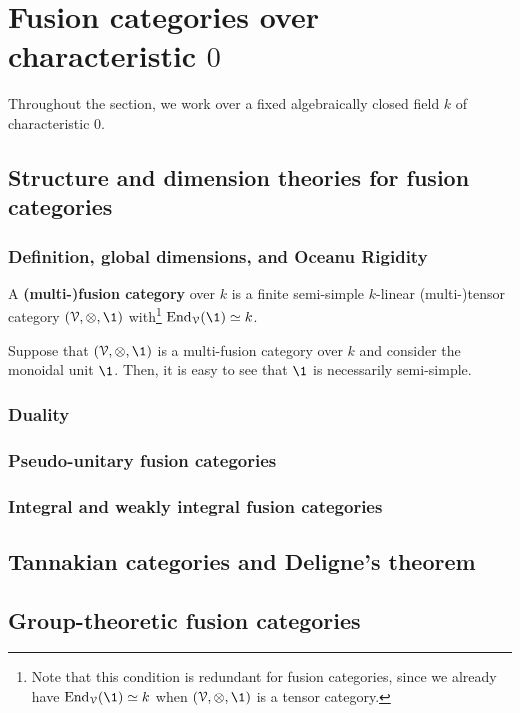 \section{Fusion categories over characteristic \texorpdfstring{$0$}{}}
    \begin{convention}
        Throughout the section, we work over a fixed algebraically closed field $k$ of characteristic $0$.
    \end{convention}

    \subsection{Structure and dimension theories for fusion categories}
        \subsubsection{Definition, global dimensions, and Oceanu Rigidity}
            \begin{definition} \label{def: fusion_categories}
                A \textbf{(multi-)fusion category} over $k$ is a finite semi-simple $k$-linear (multi-)tensor category $(\calV, \tensor, \1)$ with\footnote{Note that this condition is redundant for fusion categories, since we already have $\End_{\calV}(\1) \cong k$ when $(\calV, \tensor, \1)$ is a tensor category.} $\End_{\calV}(\1) \cong k$.
            \end{definition}
            \begin{remark} \label{remark: semi_simplicity_of_monoidal_units_of_multi_fusion_categories}
                Suppose that $(\calV, \tensor, \1)$ is a multi-fusion category over $k$ and consider the monoidal unit $\1$. Then, it is easy to see that $\1$ is necessarily semi-simple. 
            \end{remark}
            
        \subsubsection{Duality}
        
        \subsubsection{Pseudo-unitary fusion categories}
        
        \subsubsection{Integral and weakly integral fusion categories}

    \subsection{Tannakian categories and Deligne's theorem}
    
    \subsection{Group-theoretic fusion categories}